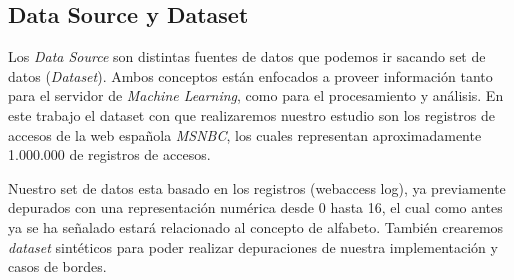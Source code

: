 \subsection{Data Source y Dataset }

	Los \emph{Data Source} son distintas fuentes de datos que podemos ir sacando set de datos (\emph{Dataset}). Ambos conceptos están enfocados a proveer información tanto para el servidor de \emph{Machine Learning}, como para el procesamiento y análisis.
	En este trabajo el dataset con que realizaremos nuestro estudio son los registros de accesos de la web española \emph{MSNBC}\cite{Claude2014}, los cuales representan aproximadamente 1.000.000 de registros de accesos.

	Nuestro set de  datos esta basado en los registros (webaccess log), ya previamente depurados con una representación numérica desde 0 hasta 16, el cual como antes ya se ha señalado estará relacionado al concepto de alfabeto. También crearemos \emph{dataset} sintéticos para poder realizar depuraciones de nuestra implementación y casos de bordes.
	
	 



 














